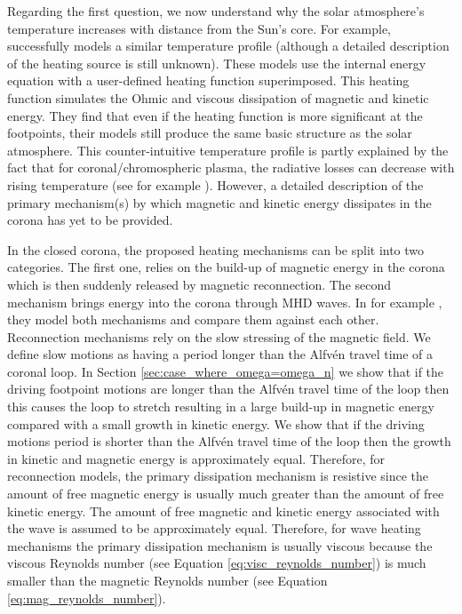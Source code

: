 Regarding the first question, we now understand why the solar atmosphere's temperature increases with distance from the Sun's core. For example, \citet{Martens2010} successfully models a similar temperature profile  (although a detailed description of the heating source is still unknown). These models use the internal energy equation with a user-defined heating function superimposed. This heating function simulates the Ohmic and viscous dissipation of magnetic and kinetic energy. They find that even if the heating function is more significant at the footpoints, their models still produce the same basic structure as the solar atmosphere. This counter-intuitive temperature profile is partly explained by the fact that for coronal/chromospheric plasma, the radiative losses can decrease with rising temperature (see for example \citealt{Klimchuck2008}).
However, a detailed description of the primary mechanism(s) by which magnetic and kinetic energy dissipates in the corona has yet to be provided.

In the closed corona, the proposed heating mechanisms can be split into two categories. The first one, relies on the build-up of magnetic energy in the corona which is then suddenly released by magnetic reconnection. The second mechanism brings energy into the corona through MHD waves. In for example \citet{vanBallegooijen2011}, \citet{Howson2020} they model both mechanisms and compare them against each other. Reconnection mechanisms rely on the slow stressing of the magnetic field. We define slow motions as having a period longer than the Alfv\'en travel time of a coronal loop. In Section \ref{sec:case_where_omega=omega_n} we show that if the driving footpoint motions are longer than the Alfv\'en travel time of the loop then this causes the loop to stretch resulting in a large build-up in magnetic energy compared with a small growth in kinetic energy. We show that if the driving motions period is shorter than the Alfv\'en travel time of the loop then the growth in kinetic and magnetic energy is approximately equal. Therefore, for reconnection models, the primary dissipation mechanism is resistive since the amount of free magnetic energy is usually much greater than the amount of free kinetic energy. The amount of free magnetic and kinetic energy associated with the wave is assumed to be approximately equal. Therefore, for wave heating mechanisms the primary dissipation mechanism is usually viscous because the viscous Reynolds number (see Equation \ref{eq:visc_reynolds_number}) is much smaller than the magnetic Reynolds number (see Equation \ref{eq:mag_reynolds_number}).


